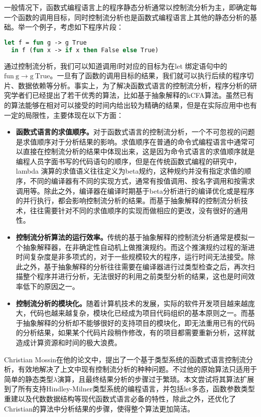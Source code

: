 \documentclass[12pt, titlepage]{article}
\begin{document}
	一般情况下，函数式编程语言上的程序静态分析通常以控制流分析为主，即确定每一个函数的调用目标，同时控制流分析也是函数式编程语言上其他的静态分析的基础。举一个例子，考虑如下程序片段：
	\begin{lstlisting}[language=Ocaml]
  let f = fun g -> g True
  in f (fun x -> if x then False else True)
	\end{lstlisting}
	通过控制流分析，我们可以知道调用f时对应的目标为在let 绑定语句中的$\mathrm{fun}\ \mathrm{g} \to \mathrm{g}\ \mathrm{True}$。一旦有了函数的调用目标的结果，我们就可以执行后续的程序切片、数据依赖等分析。事实上，为了解决函数式语言的控制流分析，程序分析的研究学者们已经提出了若干优秀的算法，比如基于抽象解释的kCFA算法。虽然已有的算法能够在相对可以接受的时间内给出较为精确的结果，但是在实际应用中也有一定的局限性，主要体现在以下方面：
	\begin{itemize}
		\item \textbf{函数式语言的求值顺序。}对于函数式语言的控制流分析，一个不可忽视的问题是求值顺序对于分析结果的影响。求值顺序在普通的命令式编程语言中通常可以直接在控制流分析的结果中体现出来，这是因为命令式语言的求值顺序就是编程人员字面书写的代码语句的顺序，但是在传统函数式编程的研究中，lambda 演算的求值语义往往定义为beta规约，这种规约并没有指定求值的顺序，不同的编译器有不同的实现方式，通常有按值调用、按名字调用和按需求调用等。除此之外，编译器在编译时期基于beta分析进行的编译优化或是程序的并行执行，都会影响控制流分析的结果。而基于抽象解释的控制流分析技术，往往需要针对不同的求值顺序的实现而做相应的更改，没有很好的通用性。
		\item \textbf{控制流分析算法的运行效率。}传统的基于抽象解释的控制流分析通常是模拟一个抽象解释器，在非确定性自动机上做推演规约。而这个推演规约过程的渐进时间复杂度是非多项式的，对于一些规模较大的程序，运行时间无法接受。除此之外，基于抽象解释的分析往往需要在编译器进行过类型检查之后，再次扫描整个程序并进行分析，无法很好的利用之前类型分析的结果，这也是时间效率低下的原因之一。
		\item \textbf{控制流分析的模块化。}随着计算机技术的发展，实际的软件开发项目越来越庞大，代码也越来越复杂，模块化已经成为项目代码组织的基本原则之一。而基于抽象解释的分析却不能够很好的支持项目的模块化，即无法重用已有的代码的分析结果，如果某个代码片段稍作修改，有的项目都需要重新分析，这样就造成计算资源和时间的极大浪费。
	\end{itemize}
	Christian Mossin在他的论文中，提出了一个基于类型系统的函数式语言控制流分析，有效地解决了上文中现有控制流分析的种种问题。不过他的原始算法只适用于简单的静态类型$\lambda$演算，且最终结果分析的步骤过于繁琐。本文尝试将其算法扩展到了所有支持Hindley-Milner类型系统的编程语言，并包括let多态，函数参数类型重建以及代数数据结构等现代函数式语言必备的特性，除此之外，还优化了Christian的算法中分析结果的步骤，使得整个算法更加简洁。
	
\end{document}
